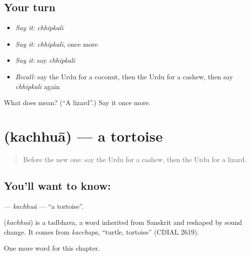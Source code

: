 \subsection*{Your turn}
\begin{itemize}
\raggedright
  \item \emph{Say it:} \emph{chhipkalī}
  \item \emph{Say it:} \emph{chhipkalī}, once more
  \item \emph{Say it:} say \emph{chhipkalī}
  \item \emph{Recall:} say the Urdu for a coconut, then the Urdu for a cashew, then say \emph{chhipkalī} again
\end{itemize}

\begin{tcolorbox}[breakable,colback=teal!4,colframe=teal!35!black,title={Before you move on}]
What does  mean? (\textquotedblleft{}A lizard\textquotedblright{}.) Say it once more.
\end{tcolorbox}
\section[\texorpdfstring{\ur{کچھوا} (kachhuā)}{کچھوا (kachhuā)}]{ (kachhuā) — a tortoise}

\label{lesson:UR-C253-kachhua}



\begin{quote}
Before the new one: say the Urdu for a cashew, then the Urdu for a lizard.
\end{quote}

\subsection*{You'll want to know: }
\textbf{} — \emph{kachhuā} — \textquotedblleft{}a tortoise\textquotedblright{}.

\begin{cousinweb}
\textbf{} (\emph{kachhuā}) is a tadbhava, a word inherited from Sanskrit and reshaped by sound change. It comes from \emph{kacchapa}, \textquotedblleft{}turtle, tortoise\textquotedblright{} (CDIAL 2619).
\end{cousinweb}

\begin{grammarlens}[title={What you've built}]
One more word for this chapter.
\end{grammarlens}

